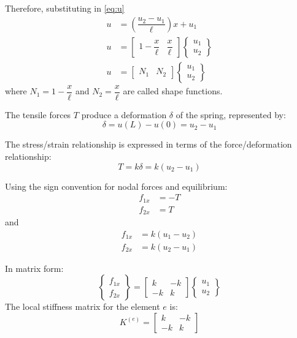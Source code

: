 Therefore, substituting  in \autoref{eq:u}
%
\begin{align}
    u &= \left( \dfrac{u_2 - u_1}{\ell} \right)x + u_1 \\
    u &= \begin{bmatrix} 1 - \dfrac{x}{\ell} & \dfrac{x}{\ell}  \end{bmatrix} \begin{Bmatrix} u_1 \\ u_2 \end{Bmatrix} \\
    u &= \begin{bmatrix} N_1 & N_2 \end{bmatrix} \begin{Bmatrix} u_1 \\ u_2 \end{Bmatrix}
\end{align}
%
where $N_1 = 1 - \dfrac{x}{\ell}$ and $N_2 = \dfrac{x}{\ell}$ are called shape functions.

The tensile forces $T$ produce a deformation $\delta$ of the spring, represented by:
%
\begin{equation}
    \delta = u(L) - u(0) = u_2 - u_1
\end{equation}

The stress/strain relationship is expressed in terms of the force/deformation relationship:
%
\begin{equation}
    T = k \delta = k(u_2 - u_1)
\end{equation}

Using the sign convention for nodal forces and equilibrium:
%
\begin{align}
    f_{1x} &= -T \\
    f_{2x} &= T
\end{align}
%
and
%
\begin{align}
    f_{1x} &= k(u_1 - u_2) \\
    f_{2x} &= k(u_2 - u_1)
\end{align}

In matrix form:
%
\begin{equation}
    \begin{Bmatrix} f_{1x} \\ f_{2x} \end{Bmatrix} = \begin{bmatrix} k & -k \\ -k & k \end{bmatrix} \begin{Bmatrix} u_1 \\ u_2 \end{Bmatrix}
\end{equation}
%
The local stiffness matrix for the element $e$ is:
%
\begin{equation}
    K^{(e)} = \begin{bmatrix} k & -k \\ -k & k \end{bmatrix}
\end{equation}

